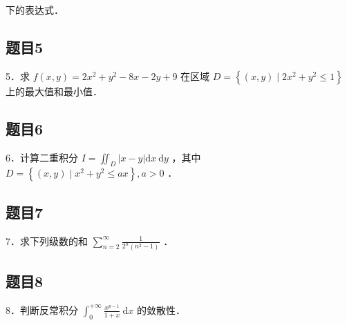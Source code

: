 \documentclass{article}
\begin{document}
下的表达式．

\subsection{题目5}
5．求 \(f(x, y)=2 x^{2}+y^{2}-8 x-2 y+9\) 在区域 \(D=\left\{(x, y) \mid 2 x^{2}+y^{2} \leq 1\right\}\) 上的最大值和最小值．

\subsection{题目6}
6．计算二重积分 \(I=\iint_{D}|x-y| \mathrm{d} x \mathrm{~d} y\) ，其中 \(D=\left\{(x, y) \mid x^{2}+y^{2} \leq a x\right\}, a>0\) ．

\subsection{题目7}
7．求下列级数的和 \(\sum_{n=2}^{\infty} \frac{1}{2^{n}\left(n^{2}-1\right)}\) ．

\subsection{题目8}
8．判断反常积分 \(\int_{0}^{+\infty} \frac{x^{p-1}}{1+x} \mathrm{~d} x\) 的敛散性．
\end{document}
